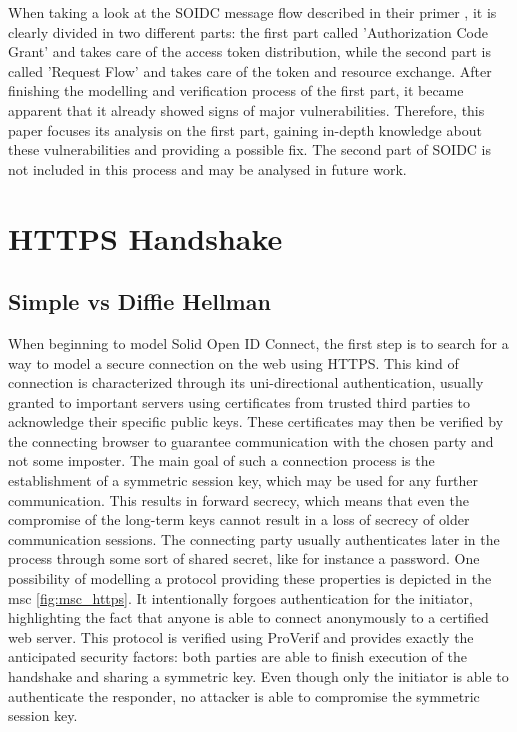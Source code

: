 \documentclass[11pt,twoside,a4paper,openright]{book}
\begin{document}
When taking a look at the SOIDC message flow described in their primer \cite{solidPrimer}, it is clearly divided in two different parts: the first part called 'Authorization Code Grant' and takes care of the access token distribution, while the second part is called 'Request Flow' and takes care of the token and resource exchange. After finishing the modelling and verification process of the first part, it became apparent that it already showed signs of major vulnerabilities. Therefore, this paper focuses its analysis on the first part, gaining in-depth knowledge about these vulnerabilities and providing a possible fix. The second part of SOIDC is not included in this process and may be analysed in future work.


\section{HTTPS Handshake}

\subsection{Simple vs Diffie Hellman}

When beginning to model Solid Open ID Connect, the first step is to search for a way to model a secure connection on the web using HTTPS. This kind of connection is characterized through its uni-directional authentication, usually granted to important servers using certificates from trusted third parties to acknowledge their specific public keys. These certificates may then be verified by the connecting browser to guarantee communication with the chosen party and not some imposter. The main goal of such a connection process is the establishment of a symmetric session key, which may be used for any further communication. This results in forward secrecy, which means that even the compromise of the long-term keys cannot result in a loss of secrecy of older communication sessions. The connecting party usually authenticates later in the process through some sort of shared secret, like for instance a password. One possibility of modelling a protocol providing these properties is depicted in the msc \ref{fig:msc_https}. It intentionally forgoes authentication for the initiator, highlighting the fact that anyone is able to connect anonymously to a certified web server. This protocol is verified using ProVerif and provides exactly the anticipated security factors: both parties are able to finish execution of the handshake and sharing a symmetric key. Even though only the initiator is able to authenticate the responder, no attacker is able to compromise the symmetric session key. 
\end{document}
